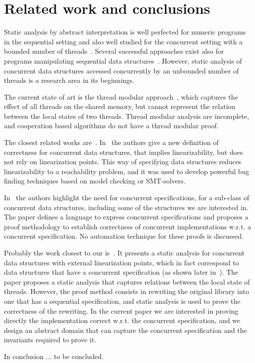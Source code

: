 \section{Related work and conclusions}
\label{sec:relwork}

Static analysis by abstract interpretation is well perfected for numeric programs in the sequential setting and also well studied for the concurrent setting with a bounded number of threads~\cite{mine15,DBLP:journals/lisp/Mine06,DBLP:conf/popl/CousotH78}. 
Several successful approaches exist also for programs manipulating  sequential data structures~\cite{SagivRW02,LiBCR17,pldi11}. 
However, static analysis of concurrent data structures accessed concurrently by an unbounded number of threads is a research area in its beginnings. 

The current state of art is the thread modular approach~\cite{threadmodular, Vafeiadis09, vv1}, which  captures the effect of all threads on the shared memory, but cannot represent the relation between the local states of two threads.  Thread modular analysis are incomplete, and cooperation based algorithms do not have a thread modular proof. 

The closest related works are~\cite{cav13,ee1,ee2,ee3,disc15}. 
In~\cite{ee1,ee2,ee3} the authors give a new definition of correctness for concurrent data structures, that implies linearizability, but does not rely on linearization points.  This way of specifying data structures  reduces linearizability to a reachability problem, and it was used to develop powerful bug finding techniques based on model checking or SMT-solvers. 

In~\cite{disc15} the authors highlight the need for concurrent specifications, for a sub-class of concurrent data structures, including some of the structures we are interested in. The paper defines a language to express concurrent specifications and proposes a proof methodology to establish correctness of concurrent implementations w.r.t. a concurrent specification.  No automation technique for these proofs is discussed.  

Probably the work closest to our is~\cite{cav13}. It presents a static analysis for concurrent data structures with external linearization points, which in fact correspond to data structures that have a concurrent specification (as shown later in~\cite{disc15}).  
The paper proposes a static analysis that captures relations between the local state of threads.  
However, the proof method consists in rewriting the original library into one that has a sequential specification, and static analysis is used to prove the correctness of the rewriting. In the current paper we are interested in proving directly the implementation correct w.r.t. the concurrent specification, and we design an abstract domain that can capture the concurrent specification and the invariants required to prove it. 

In conclusion ... to be concluded. 
